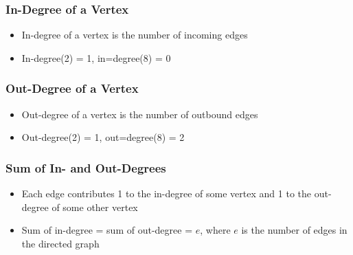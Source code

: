 \documentclass[newPxFont,sthlmFooter,nooffset]{beamer}
\begin{document}
\begin{frame}[t]
  \frametitle{In-Degree of a Vertex}
  \begin{itemize}
  \item In-degree of a vertex is the number of incoming edges
  \item In-degree(2) = 1, in=degree(8) = 0
  \end{itemize}
  \begin{center}
  \end{center}

\end{frame}

\begin{frame}[t]
  \frametitle{Out-Degree of a Vertex}
  \begin{itemize}
  \item Out-degree of a vertex is the number of outbound edges
  \item Out-degree(2) = 1, out=degree(8) = 2
  \end{itemize}
  \begin{center}
  \end{center}

\end{frame}


\begin{frame}[t]
  \frametitle{Sum of In- and Out-Degrees}
  \begin{itemize}
  \item Each edge contributes 1 to the in-degree of some vertex and 1 to the out-degree of some other vertex
  \item Sum of in-degree = sum of out-degree = $e$, where $e$ is the number of edges in the directed graph
  \end{itemize}
\end{frame}
\end{document}
